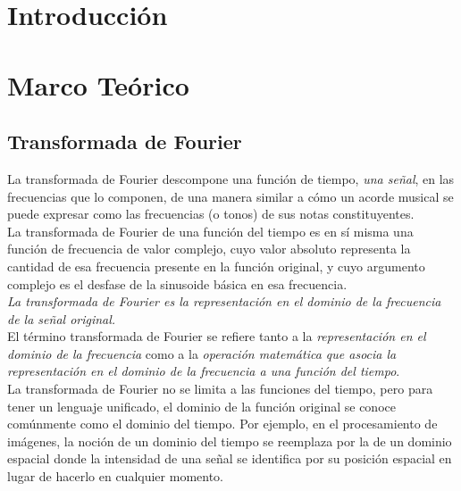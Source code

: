 \documentclass[osajnl,twocolumn,showpacs,superscriptaddress,10pt,floatfix]{revtex4-1} %
\begin{document}
\title{}

\author{Ulises Jeremias Cornejo Fandos}

\begin{abstract}

\end{abstract}

\maketitle %

\section{Introducción}

\section{Marco Teórico}

\subsection{Transformada de Fourier}

La transformada de Fourier descompone una función de tiempo, \textit{una señal}, en las frecuencias que lo componen,
de una manera similar a cómo un acorde musical se puede expresar como las frecuencias (o tonos) de sus notas
constituyentes. \\

La transformada de Fourier de una función del tiempo es en sí misma una función de frecuencia
de valor complejo, cuyo valor absoluto representa la cantidad de esa frecuencia presente en la función
original, y cuyo argumento complejo es el desfase de la sinusoide básica en esa frecuencia. \\

\textit{La transformada de Fourier es la representación en el dominio de la frecuencia de la señal original.} \\

El término transformada de Fourier se refiere tanto a la \textit{representación en el dominio de la frecuencia} como
a la \textit{operación matemática que asocia la representación en el dominio de la frecuencia a una función del tiempo}. \\

La transformada de Fourier no se limita a las funciones del tiempo, pero para tener un lenguaje unificado,
el dominio de la función original se conoce comúnmente como el dominio del tiempo. Por ejemplo, en el
procesamiento de imágenes, la noción de un dominio del tiempo se reemplaza por la de un dominio
espacial donde la intensidad de una señal se identifica por su posición espacial en lugar de hacerlo
en cualquier momento. \\
\end{document}
